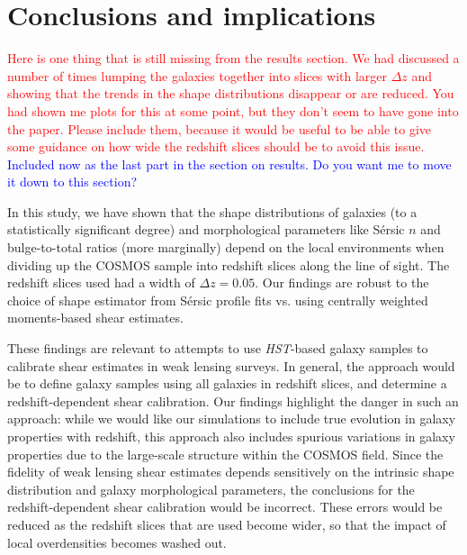 \documentclass[twocolumn,useAMS,usenatbib]{mn2e}
\newcommand{\rachel}[1]{{\textcolor{red}{#1}}}
\newcommand{\arun}[1]{{\textcolor{blue}{#1}}}
\newcommand{\sersic}{S\'{e}rsic }
\begin{document}
\section{Conclusions and implications}
\label{S:summary}

\rachel{Here is one thing that is still missing from the results
  section.  We had discussed a number of times lumping the galaxies
  together into slices with larger $\Delta z$ and showing that the
  trends in the shape distributions disappear or are reduced.  You had
  shown me plots for this at some point, but they don't seem to have
  gone into the paper.  Please include them, because it would be
  useful to be able to give some guidance on how wide the redshift
  slices should be to avoid this issue.}
\arun{Included now as the last part in the section on results. Do you want me to move it down to this section?}  

In this study, we have shown that the shape distributions of galaxies
(to a statistically significant degree) and morphological parameters
like \sersic $n$ and bulge-to-total ratios (more marginally) depend on
the local environments when dividing up the COSMOS sample into
redshift slices along the line of sight.  The redshift slices used had
a width of $\Delta z=0.05$.  Our findings are robust to the choice of
shape estimator from \sersic profile fits vs. using centrally weighted
moments-based shear estimates.

These findings are relevant to attempts to use {\em HST}-based galaxy
samples to calibrate shear estimates in weak lensing surveys.  In
general, the approach would be to define galaxy samples using all
galaxies in redshift slices, and determine a redshift-dependent shear
calibration.  Our findings highlight the danger in such an approach:
while we would like our simulations to include true evolution in
galaxy properties with redshift, this approach also includes spurious
variations in galaxy properties due to the large-scale structure
within the COSMOS field.  Since the fidelity of weak lensing shear
estimates depends sensitively on the intrinsic shape distribution and
galaxy morphological parameters, the conclusions for the
redshift-dependent shear calibration would be incorrect.  These errors
would be reduced as the redshift slices that are used become wider, so
that the impact of local overdensities becomes washed out.
\end{document}
